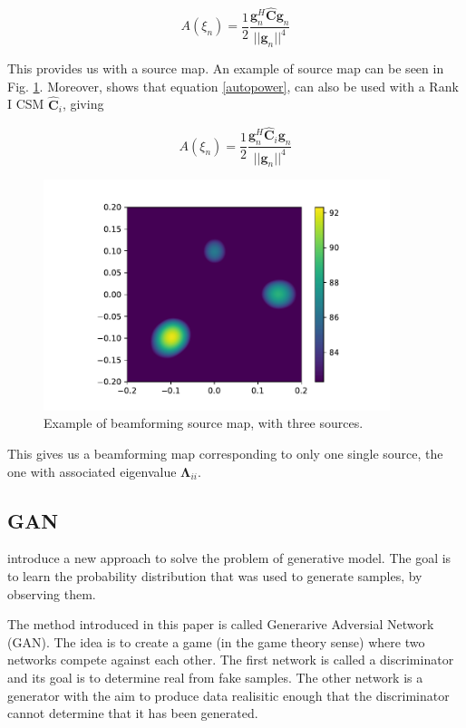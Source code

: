 \documentclass[11pt,a4paper,twoside]{report}
\begin{document}
\begin{equation}
    \label{autopower}
    A(\xi_n) = \frac{1}{2} \frac{\mathbf{g}_{n}^H \hat{\mathbf{C}} \mathbf{g}_{n}}{||\mathbf{g}_{n}||^4}
\end{equation}

This provides us with a source map. An example of source map can be seen in Fig. \ref{fig:beamforming_example}. Moreover, \cite{sarradj2010fast} shows that equation \ref{autopower}, can also be used with a Rank I CSM $\hat{\mathbf{C}}_i$, giving

\begin{equation}
    A(\xi_n) = \frac{1}{2} \frac{\mathbf{g}_{n}^H \hat{\mathbf{C}}_i \mathbf{g}_{n}}{||\mathbf{g}_{n}||^4}
\end{equation}

\begin{figure}
    \centering
    \includegraphics[width=0.9\textwidth]{figs/beamforming_example.pdf}
    \caption{Example of beamforming source map, with three sources.}
    \label{fig:beamforming_example}    
\end{figure}

This gives us a beamforming map corresponding to only one single source, the one with associated eigenvalue $\mathbf{\Lambda}_{ii}$.


\subsection{GAN}

\cite{goodfellow2020generative} introduce a new approach to solve the problem of generative model. The goal is to learn the probability distribution that was used to generate samples, by observing them.

The method introduced in this paper is called Generarive Adversial Network (GAN). The idea is to create a game (in the game theory sense) where two networks compete against each other. The first network is called a discriminator and its goal is to determine real from fake samples. The other network is a  generator with the aim to produce data realisitic enough that the discriminator cannot determine that it has been generated.
\end{document}
